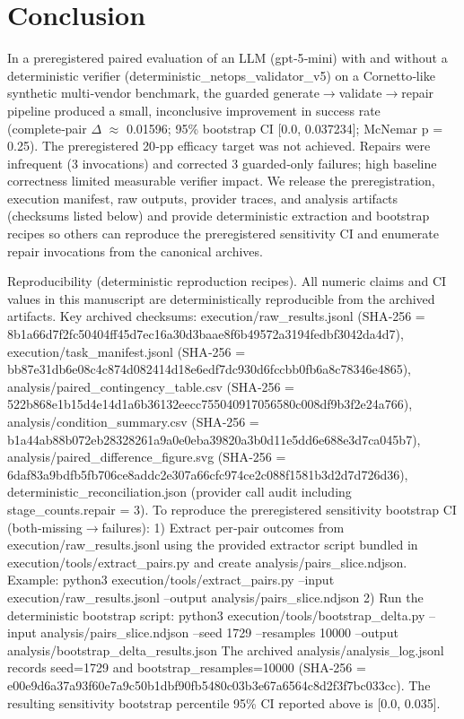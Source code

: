 \documentclass[conference]{IEEEtran}
\begin{document}
\section{Conclusion}
In a preregistered paired evaluation of an LLM (gpt‑5‑mini) with and without a deterministic verifier (deterministic\_netops\_validator\_v5) on a Cornetto‑like synthetic multi‑vendor benchmark, the guarded generate\ensuremath{\rightarrow}validate\ensuremath{\rightarrow}repair pipeline produced a small, inconclusive improvement in success rate (complete‑pair \ensuremath{\Delta} \ensuremath{\approx} 0.01596; 95\% bootstrap CI [0.0, 0.037234]; McNemar p = 0.25). The preregistered 20‑pp efficacy target was not achieved. Repairs were infrequent (3 invocations) and corrected 3 guarded‑only failures; high baseline correctness limited measurable verifier impact. We release the preregistration, execution manifest, raw outputs, provider traces, and analysis artifacts (checksums listed below) and provide deterministic extraction and bootstrap recipes so others can reproduce the preregistered sensitivity CI and enumerate repair invocations from the canonical archives.

Reproducibility (deterministic reproduction recipes). All numeric claims and CI values in this manuscript are deterministically reproducible from the archived artifacts. Key archived checksums: execution/raw\_results.jsonl (SHA‑256 = 8b1a66d7f2fc50404ff45d7ec16a30d3baae8f6b49572a3194fedbf3042da4d7), execution/task\_manifest.jsonl (SHA‑256 = bb87e31db6e08c4c874d082414d18e6edf7dc930d6fccbb0fb6a8c78346e4865), analysis/paired\_contingency\_table.csv (SHA‑256 = 522b868e1b15d4e14d1a6b36132eecc755040917056580c008df9b3f2e24a766), analysis/condition\_summary.csv (SHA‑256 = b1a44ab88b072eb28328261a9a0e0eba39820a3b0d11e5dd6e688e3d7ca045b7), analysis/paired\_difference\_figure.svg (SHA‑256 = 6daf83a9bdfb5fb706ce8addc2e307a66cfc974ce2c088f1581b3d2d7d726d36), deterministic\_reconciliation.json (provider call audit including stage\_counts.repair = 3). To reproduce the preregistered sensitivity bootstrap CI (both‑missing\ensuremath{\rightarrow}failures):
1) Extract per‑pair outcomes from execution/raw\_results.jsonl using the provided extractor script bundled in execution/tools/extract\_pairs.py and create analysis/pairs\_slice.ndjson.
   Example: python3 execution/tools/extract\_pairs.py --input execution/raw\_results.jsonl --output analysis/pairs\_slice.ndjson
2) Run the deterministic bootstrap script:
   python3 execution/tools/bootstrap\_delta.py --input analysis/pairs\_slice.ndjson --seed 1729 --resamples 10000 --output analysis/bootstrap\_delta\_results.json
The archived analysis/analysis\_log.jsonl records seed=1729 and bootstrap\_resamples=10000 (SHA‑256 = e00e9d6a37a93f60e7a9c50b1dbf90fb5480c03b3e67a6564c8d2f3f7bc033cc). The resulting sensitivity bootstrap percentile 95\% CI reported above is [0.0, 0.035].
\end{document}
